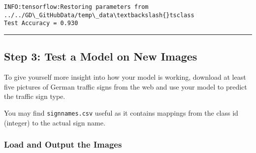 \documentclass[11pt]{article}
\begin{document}
    \begin{Verbatim}[commandchars=\\\{\}]
INFO:tensorflow:Restoring parameters from ../../GD\_GitHubData/temp\_data\textbackslash{}tsclass
Test Accuracy = 0.930

    \end{Verbatim}

    \begin{center}\rule{0.5\linewidth}{\linethickness}\end{center}

\subsection{Step 3: Test a Model on New
Images}\label{step-3-test-a-model-on-new-images}

To give yourself more insight into how your model is working, download
at least five pictures of German traffic signs from the web and use your
model to predict the traffic sign type.

You may find \texttt{signnames.csv} useful as it contains mappings from
the class id (integer) to the actual sign name.

    \subsubsection{Load and Output the
Images}\label{load-and-output-the-images}
\end{document}
